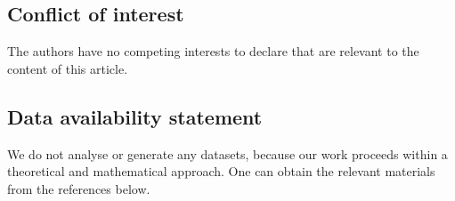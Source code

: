 \documentclass[pdflatex,sn-mathphys-num]{sn-jnl}%
\begin{document}
\subsection*{Conflict of interest} 
The authors have no competing interests to declare that are relevant to the content of this article.

\subsection*{Data availability statement} 
We do not analyse or generate any datasets, because our work proceeds within a theoretical and mathematical approach. One can obtain the relevant materials from the references below.
 

\end{document}
